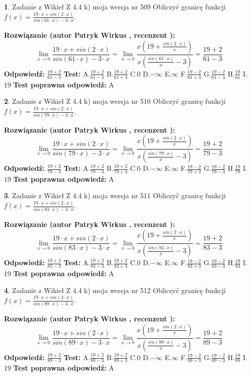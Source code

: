 \documentclass[12pt, a4paper]{article}
\theoremstyle{definition} %
\newtheorem{zad}{}
\newcommand{\zadStart}[1]{\begin{zad}#1\newline}
\newcommand{\zadStop}{\end{zad}}
\newcommand{\rozwStart}[2]{\noindent \textbf{Rozwiązanie (autor #1 , recenzent #2): }\newline}
\newcommand{\rozwStop}{\newline}
\newcommand{\odpStart}{\noindent \textbf{Odpowiedź:}\newline}
\newcommand{\odpStop}{\newline}
\newcommand{\testStart}{\noindent \textbf{Test:}\newline}
\newcommand{\testStop}{\newline}
\newcommand{\kluczStart}{\noindent \textbf{Test poprawna odpowiedź:}\newline}
\newcommand{\kluczStop}{\newline}
\begin{document}
\zadStart{Zadanie z Wikieł Z 4.4 k) moja wersja nr 509}
Obliczyć granicę funkcji $f(x)=\frac{19\cdot x +sin(2\cdot x)}{sin(61\cdot x) -3\cdot x}$.
\zadStop
\rozwStart{Patryk Wirkus}{}
$$\lim\limits_{x\to 0}\frac{19\cdot x +sin(2\cdot x)}{sin(61\cdot x) -3\cdot x}
=\lim\limits_{x\to 0}\frac{x(19+\frac{sin(2\cdot x)}{x})}{x(\frac{sin(61\cdot x)}{x}-3)}
=\frac{19+2}{61-3}$$
\rozwStop
\odpStart
$\frac{19+2}{61-3}$
\odpStop
\testStart
A.$\frac{19+2}{61-3}$
B.$\frac{19+2}{61+3}$
C.$0$
D.$-\infty$
E.$\infty$
F.$\frac{19-2}{61+3}$
G.$\frac{19-2}{61-3}$
H.$\frac{19}{61}$
I.$19$
\testStop
\kluczStart
A
\kluczStop



\zadStart{Zadanie z Wikieł Z 4.4 k) moja wersja nr 510}
Obliczyć granicę funkcji $f(x)=\frac{19\cdot x +sin(2\cdot x)}{sin(79\cdot x) -3\cdot x}$.
\zadStop
\rozwStart{Patryk Wirkus}{}
$$\lim\limits_{x\to 0}\frac{19\cdot x +sin(2\cdot x)}{sin(79\cdot x) -3\cdot x}
=\lim\limits_{x\to 0}\frac{x(19+\frac{sin(2\cdot x)}{x})}{x(\frac{sin(79\cdot x)}{x}-3)}
=\frac{19+2}{79-3}$$
\rozwStop
\odpStart
$\frac{19+2}{79-3}$
\odpStop
\testStart
A.$\frac{19+2}{79-3}$
B.$\frac{19+2}{79+3}$
C.$0$
D.$-\infty$
E.$\infty$
F.$\frac{19-2}{79+3}$
G.$\frac{19-2}{79-3}$
H.$\frac{19}{79}$
I.$19$
\testStop
\kluczStart
A
\kluczStop



\zadStart{Zadanie z Wikieł Z 4.4 k) moja wersja nr 511}
Obliczyć granicę funkcji $f(x)=\frac{19\cdot x +sin(2\cdot x)}{sin(83\cdot x) -3\cdot x}$.
\zadStop
\rozwStart{Patryk Wirkus}{}
$$\lim\limits_{x\to 0}\frac{19\cdot x +sin(2\cdot x)}{sin(83\cdot x) -3\cdot x}
=\lim\limits_{x\to 0}\frac{x(19+\frac{sin(2\cdot x)}{x})}{x(\frac{sin(83\cdot x)}{x}-3)}
=\frac{19+2}{83-3}$$
\rozwStop
\odpStart
$\frac{19+2}{83-3}$
\odpStop
\testStart
A.$\frac{19+2}{83-3}$
B.$\frac{19+2}{83+3}$
C.$0$
D.$-\infty$
E.$\infty$
F.$\frac{19-2}{83+3}$
G.$\frac{19-2}{83-3}$
H.$\frac{19}{83}$
I.$19$
\testStop
\kluczStart
A
\kluczStop



\zadStart{Zadanie z Wikieł Z 4.4 k) moja wersja nr 512}
Obliczyć granicę funkcji $f(x)=\frac{19\cdot x +sin(2\cdot x)}{sin(89\cdot x) -3\cdot x}$.
\zadStop
\rozwStart{Patryk Wirkus}{}
$$\lim\limits_{x\to 0}\frac{19\cdot x +sin(2\cdot x)}{sin(89\cdot x) -3\cdot x}
=\lim\limits_{x\to 0}\frac{x(19+\frac{sin(2\cdot x)}{x})}{x(\frac{sin(89\cdot x)}{x}-3)}
=\frac{19+2}{89-3}$$
\rozwStop
\odpStart
$\frac{19+2}{89-3}$
\odpStop
\testStart
A.$\frac{19+2}{89-3}$
B.$\frac{19+2}{89+3}$
C.$0$
D.$-\infty$
E.$\infty$
F.$\frac{19-2}{89+3}$
G.$\frac{19-2}{89-3}$
H.$\frac{19}{89}$
I.$19$
\testStop
\kluczStart
A
\kluczStop
\end{document}
